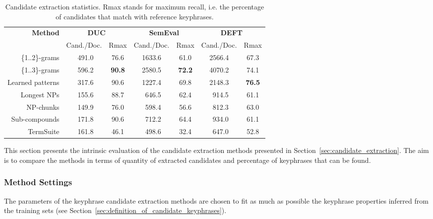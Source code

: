     \begin{table*}
      \centering
      \begin{tabular}{rcccccc}
        \toprule
        \multirow{2}{*}[-2pt]{\textbf{Method}} & \multicolumn{2}{c}{\textbf{DUC}} & \multicolumn{2}{c}{\textbf{SemEval}} & \multicolumn{2}{c}{\textbf{DEFT}}\\
        \cmidrule(r){2-3}\cmidrule(lr){4-5}\cmidrule(l){6-7}
        & Cand./Doc. & Rmax & Cand./Doc. & Rmax & Cand./Doc. & Rmax\\
        \midrule
        \{1..2\}-grams & $~~$491.0 & 76.6 & 1633.6 & 61.0 & 2566.4 & 67.3\\
        \{1..3\}-grams & $~~$596.2 & \textbf{90.8} & 2580.5 & \textbf{72.2} & 4070.2 & 74.1\\
        Learned patterns & $~~$317.6 & 90.6 & 1227.4 & 69.8 & 2148.3 & \textbf{76.5}\\
        Longest NPs & $~~$155.6 & 88.7 & $~~$646.5 & 62.4 & $~~$914.5 & 61.1\\
        NP-chunks & $~~$149.9 & 76.0 & $~~$598.4 & 56.6 & $~~$812.3 & 63.0\\
        Sub-compounds & $~~$171.8 & 90.6 & $~~$712.2 & 64.4 & $~~$934.0 & 61.1\\
        TermSuite & $~~$161.8 & 46.1 & $~~$498.6 & 32.4 & $~~$647.0 & 52.8\\
        \bottomrule
      \end{tabular}
      \caption{Candidate extraction statistics. Rmax stands for maximum recall,
               i.e. the percentage of candidates that match with reference
               keyphrases. \label{tab:candidate_extraction_statistics}}
    \end{table*}

    This section presents the intrinsic evaluation of the candidate extraction
    methods presented in Section~\ref{sec:candidate_extraction}. The aim is to
    compare the methods in terms of quantity of extracted candidates and
    percentage of keyphrases that can be found.

    \subsubsection{Method Settings}
    \label{subsubsec:method_settings}
      The parameters of the keyphrase candidate extraction methods are chosen to
      fit as much as possible the keyphrase properties inferred from the
      training sets (see Section~\ref{sec:definition_of_candidate_keyphrases}).

